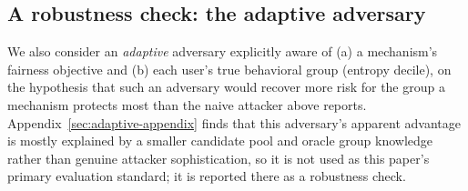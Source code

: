\subsection{A robustness check: the adaptive adversary}
\label{sec:threat-model-adaptive}

We also consider an \emph{adaptive} adversary explicitly aware of (a) a
mechanism's fairness objective and (b) each user's true behavioral
group (entropy decile), on the hypothesis that such an adversary would
recover more risk for the group a mechanism protects most than the
naive attacker above reports. Appendix~\ref{sec:adaptive-appendix}
finds that this adversary's apparent advantage is mostly explained by a
smaller candidate pool and oracle group knowledge rather than genuine
attacker sophistication, so it is not used as this paper's primary
evaluation standard; it is reported there as a robustness check.
